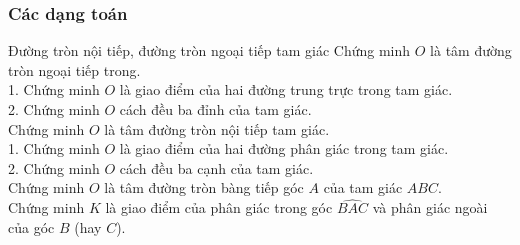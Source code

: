 \subsubsection{Các dạng toán}

\begin{dang}{Đường tròn nội tiếp, đường tròn ngoại tiếp tam giác}
Chứng minh $O$ là tâm đường tròn ngoại tiếp trong.\\
1.	Chứng minh $O$ là giao điểm của hai đường trung trực trong tam giác.\\
2.	Chứng minh $O$ cách đều ba đỉnh của tam giác.\\
Chứng minh $O$ là tâm đường tròn nội tiếp tam giác.\\
1.	Chứng minh $O$ là giao điểm của hai đường phân giác trong tam giác.\\
2.	Chứng minh $O$ cách đều ba cạnh của tam giác.\\
Chứng minh $O$ là tâm đường tròn bàng tiếp góc $A$ của tam giác $ABC$.\\
Chứng minh $K$ là giao điểm của phân giác trong góc $\widehat{BAC}$ và phân giác ngoài của góc $B$ (hay $C$).
\end{dang}

